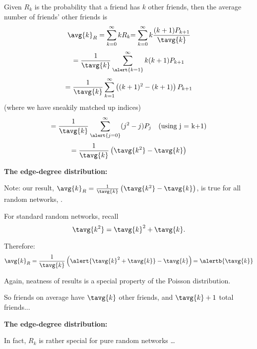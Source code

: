 \begin{frame}[label=]
\begin{frame}[label=]
\begin{frame}[label=]
\begin{frame}[label=]
\begin{frame}[label=]
\begin{frame}[label=]
\begin{frame}[label=]
\begin{frame}[label=]
\begin{frame}[label=]
\begin{frame}[label=]
\begin{frame}[label=]
\begin{frame}[label=]
\begin{frame}[label=]
\begin{frame}[label=]
\begin{frame}[label=]
\begin{frame}[label=]
\begin{frame}[label=]
     Given $R_k$ is the probability that a friend
      has $k$ other friends, then the average number of
      \alert{friends' other friends} is
      $$
      \avg{k}_{R}
      =
      \sum_{k=0}^{\infty}
      k R_k
      {
        =
        \sum_{k=0}^{\infty}
        k
        \frac{(k+1)P_{k+1}}
        {\tavg{k}}
      }
      $$
      {
        $$
        =
        \frac{1}{\tavg{k}}
        \sum_{\alert{k=1}}^{\infty}
        k(k+1)P_{k+1}
        $$
      }
      {
        $$
        =
        \frac{1}{\tavg{k}}
        \sum_{{k=1}}^{\infty}
        \left((k+1)^2 - (k+1)\right) 
        P_{k+1}
        $$
        (where we have sneakily matched up indices)
      }
      {
        $$
        =
        \frac{1}{\tavg{k}}
        \sum_{\alert{j=0}}^{\infty}
        (j^2 - j)
        P_j
        \mbox{\quad (using j = k+1)}
        $$
      }
      {
        $$
        =
        \frac{1}{\tavg{k}}
        \left(
          \tavg{k^2} - \tavg{k}
        \right)
        $$
      }
    


  \textbf{The edge-degree distribution:}

  
   Note: our result, 
    $
    \avg{k}_{R}
    =
    \frac{1}{\tavg{k}}
    \left(
      \tavg{k^2} - \tavg{k}
    \right)
    $,
    is true for \alert{all} random networks, 
    .
  
    For standard random networks, recall
    $$
    \tavg{k^2} = \tavg{k}^2 + \tavg{k}.
    $$
  
    Therefore:
    $$
    \avg{k}_{R}
    =
    \frac{1}{\tavg{k}}
    \left(
      \alert{\tavg{k}^2 + \tavg{k}} - \tavg{k}
    \right)
    {
      = \alertb{\tavg{k}}
    }
    $$
  
    Again, neatness of results is a special property of the Poisson distribution.
  
    So friends on average have $\tavg{k}$ other friends,
    and $\tavg{k}+1$ total friends...
  


  \textbf{The edge-degree distribution:}

  
  
    In fact, $R_k$ is rather special for pure random networks \ldots
  

\end{frame}
\end{frame}
\end{frame}
\end{frame}
\end{frame}
\end{frame}
\end{frame}
\end{frame}
\end{frame}
\end{frame}
\end{frame}
\end{frame}
\end{frame}
\end{frame}
\end{frame}
\end{frame}
\end{frame}
